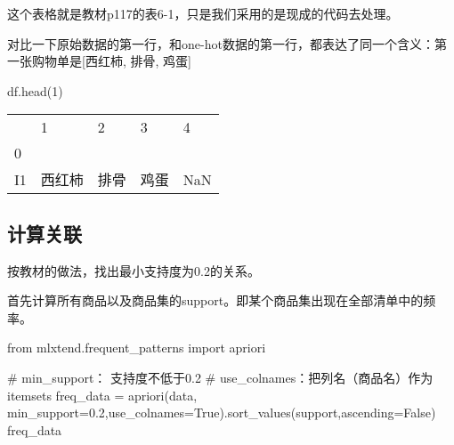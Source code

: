 \documentclass[
  letterpaper,
  DIV=11,
  numbers=noendperiod]{scrreprt}
\newenvironment{Shaded}{\begin{snugshade}}{\end{snugshade}}
\newcommand{\CommentTok}[1]{\textcolor[rgb]{0.37,0.37,0.37}{#1}}
\newcommand{\DecValTok}[1]{\textcolor[rgb]{0.68,0.00,0.00}{#1}}
\newcommand{\FloatTok}[1]{\textcolor[rgb]{0.68,0.00,0.00}{#1}}
\newcommand{\ImportTok}[1]{\textcolor[rgb]{0.00,0.46,0.62}{#1}}
\newcommand{\NormalTok}[1]{\textcolor[rgb]{0.00,0.23,0.31}{#1}}
\newcommand{\OperatorTok}[1]{\textcolor[rgb]{0.37,0.37,0.37}{#1}}
\newcommand{\StringTok}[1]{\textcolor[rgb]{0.13,0.47,0.30}{#1}}
\newcommand{\VariableTok}[1]{\textcolor[rgb]{0.07,0.07,0.07}{#1}}
\begin{document}
这个表格就是教材p117的表6-1，只是我们采用的是现成的代码去处理。

对比一下原始数据的第一行，和one-hot数据的第一行，都表达了同一个含义：第一张购物单是{[}西红柿,
排骨, 鸡蛋{]}

\begin{Shaded}
\begin{Highlighting}[]
\NormalTok{df.head(}\DecValTok{1}\NormalTok{)}
\end{Highlighting}
\end{Shaded}

\begin{longtable}[]{@{}lllll@{}}
\toprule\noalign{}
& 1 & 2 & 3 & 4 \\
0 & & & & \\
\midrule\noalign{}
\endhead
\bottomrule\noalign{}
\endlastfoot
I1 & 西红柿 & 排骨 & 鸡蛋 & NaN \\
\end{longtable}

\hypertarget{ux8ba1ux7b97ux5173ux8054}{%
\subsection{计算关联}\label{ux8ba1ux7b97ux5173ux8054}}

按教材的做法，找出最小支持度为0.2的关系。

首先计算所有商品以及商品集的support。即某个商品集出现在全部清单中的频率。

\begin{Shaded}
\begin{Highlighting}[]
\ImportTok{from}\NormalTok{ mlxtend.frequent\_patterns }\ImportTok{import}\NormalTok{ apriori}

\CommentTok{\# min\_support： 支持度不低于0.2}
\CommentTok{\# use\_colnames：把列名（商品名）作为itemsets}
\NormalTok{freq\_data }\OperatorTok{=}\NormalTok{ apriori(data, min\_support}\OperatorTok{=}\FloatTok{0.2}\NormalTok{,use\_colnames}\OperatorTok{=}\VariableTok{True}\NormalTok{).sort\_values(}\StringTok{\textquotesingle{}support\textquotesingle{}}\NormalTok{,ascending}\OperatorTok{=}\VariableTok{False}\NormalTok{)}
\NormalTok{freq\_data}
\end{Highlighting}
\end{Shaded}
\end{document}
